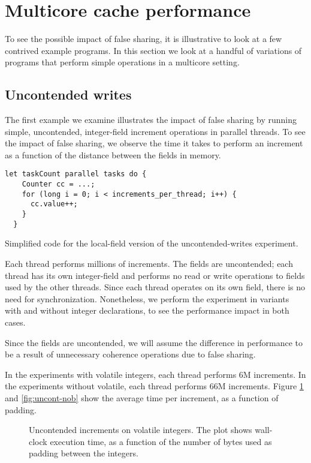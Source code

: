\section{Multicore cache performance}

To see the possible impact of false sharing, it is illustrative to look at a
few contrived example programs. In this section we look at a handful of
variations of programs that perform simple operations in a multicore
setting.

\subsection{Uncontended writes}
The first example we examine illustrates the impact of false sharing by running
simple, uncontended, integer-field increment operations in parallel threads. To see
the impact of false sharing, we observe the time it takes to perform an
increment as a function of the distance between the fields in memory.

\begin{code}
\begin{Verbatim}[frame=single]
  let taskCount parallel tasks do {
    Counter cc = ...;
    for (long i = 0; i < increments_per_thread; i++) {
      cc.value++;
    }
  }
\end{Verbatim}
	\caption{Simplified code for the local-field version of the uncontended-writes
	experiment.}
\end{code}

Each thread performs millions of increments. The fields are
uncontended; each thread has its own integer-field and performs no read or write
operations to fields used by the other threads. Since each thread operates on
its own field, there is no need for synchronization. Nonetheless, we perform
the experiment in variants with and without  integer declarations, to
see the performance impact in both cases.

Since the fields are uncontended, we will assume the difference in performance
to be a result of unnecessary coherence operations due to false sharing.

In the experiments with volatile integers, each thread performs 6M increments.
In the experiments without volatile, each thread performs 66M increments. 
Figure \ref{fig:uncont} and \ref{fig:uncont-nob} show the average time per
increment, as a function of padding.

\begin{figure}[hbpt]
\graphicspath{{plots/}}

\caption{Uncontended increments on volatile integers. The plot shows wall-clock
	execution time, as a function of the number of bytes used as padding
	between the integers.}
	\label{fig:uncont}
\end{figure}

